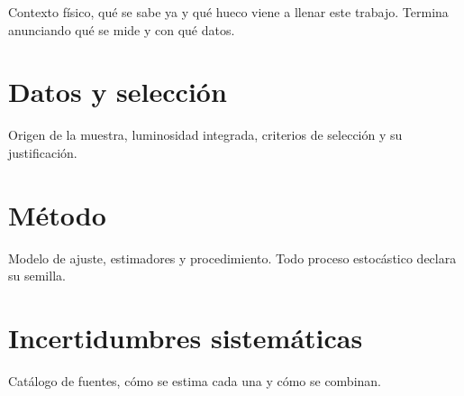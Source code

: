 \documentclass[12pt, a4paper]{article}
\begin{document}
Contexto físico, qué se sabe ya y qué hueco viene a llenar este trabajo.
Termina anunciando qué se mide y con qué datos.

\section{Datos y selección}

Origen de la muestra, luminosidad integrada, criterios de selección y su
justificación.

\section{Método}

Modelo de ajuste, estimadores y procedimiento. Todo proceso estocástico
declara su semilla.


\section{Incertidumbres sistemáticas}

Catálogo de fuentes, cómo se estima cada una y cómo se combinan.

\end{document}

